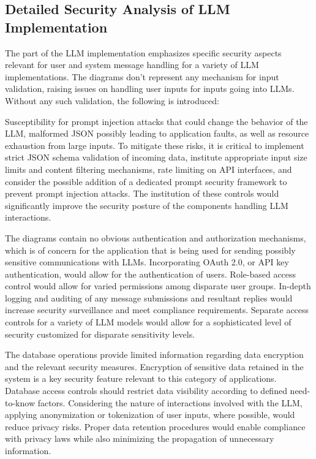 \documentclass[sigconf]{acmart}
\begin{document}
\subsection{Detailed Security Analysis of LLM Implementation}
The part of the LLM implementation emphasizes specific security aspects relevant for user and system message handling for a variety of LLM implementations. The diagrams don't represent any mechanism for input validation, raising issues on handling user inputs for inputs going into LLMs. Without any such validation, the following is introduced:

Susceptibility for prompt injection attacks that could change the behavior of the LLM, malformed JSON possibly leading to application faults, as well as resource exhaustion from large inputs. To mitigate these risks, it is critical to implement strict JSON schema validation of incoming data, institute appropriate input size limits and content filtering mechanisms, rate limiting on API interfaces, and consider the possible addition of a dedicated prompt security framework to prevent prompt injection attacks. The institution of these controls would significantly improve the security posture of the components handling LLM interactions.

The diagrams contain no obvious authentication and authorization mechanisms, which is of concern for the application that is being used for sending possibly sensitive communications with LLMs. Incorporating OAuth 2.0, or API key authentication, would allow for the authentication of users. Role-based access control would allow for varied permissions among disparate user groups. In-depth logging and auditing of any message submissions and resultant replies would increase security surveillance and meet compliance requirements. Separate access controls for a variety of LLM models would allow for a sophisticated level of security customized for disparate sensitivity levels.

The database operations provide limited information regarding data encryption and the relevant security measures. Encryption of sensitive data retained in the system is a key security feature relevant to this category of applications. Database access controls should restrict data visibility according to defined need-to-know factors. Considering the nature of interactions involved with the LLM, applying anonymization or tokenization of user inputs, where possible, would reduce privacy risks. Proper data retention procedures would enable compliance with privacy laws while also minimizing the propagation of unnecessary information.
\end{document}
